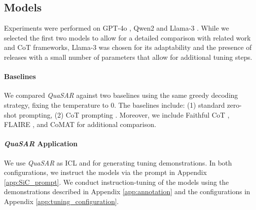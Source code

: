 \documentclass[11pt]{article}
\newcommand{\QuaSAR}{\emph{QuaSAR}\xspace}
\begin{document}
\subsection{Models} 
\label{sec:models}

Experiments were performed on GPT-4o \cite{achiam2023gpt}, Qwen2 \cite{yang2024qwen2} and Llama-3 \cite{grattafiori2024llama3herdmodels}. While we selected the first two models to allow for a detailed comparison with related work and CoT frameworks, Llama-3  was chosen for its adaptability and the presence of releases with a small number of parameters that allow for additional tuning steps. 

\paragraph{Baselines} We compared \QuaSAR against two baselines using the same greedy decoding strategy, fixing the temperature to 0. The baselines include: (1) standard zero-shot prompting, (2) CoT prompting \cite{kojima2022large}. 
Moreover, we include Faithful CoT \cite{lyu2023faithful}, FLAIRE \cite{arakelyan2024flarefaithfullogicaidedreasoning}, and CoMAT \cite{leang2024comatchainmathematicallyannotated} for additional comparison. 

\paragraph{\QuaSAR Application} We use \QuaSAR as ICL and for generating tuning demonstrations. In both configurations, we instruct the models via the prompt in Appendix \ref{app:SiC_prompt}. We conduct instruction-tuning of the models using the demonstrations described in Appendix \ref{app:annotation} and the configurations in Appendix \ref{app:tuning_configuration}.
\end{document}
